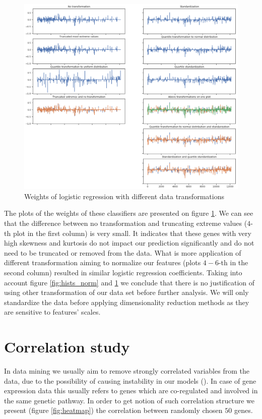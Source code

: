 \documentclass[shortabstract, english, mgr]{iithesis}
\begin{document}
\begin{figure}
\centering
\includegraphics[width=1.1\textwidth]{images/normalization_coeffs.png}
\caption{Weights of logistic regression with different data transformations}
\label{fig:normalization}
\end{figure}

The plots of the weights of these classifiers are presented on figure \ref{fig:normalization}. We can see that the difference between no transformation and truncating extreme values ($4$-th plot in the first column) is very small. It indicates that these genes with very high skewness and kurtosis do not impact our prediction significantly and do not need to be truncated or removed from the data. What is more application of different transformation aiming to normalize our features (plots $4-6$-th in the second column) resulted in similar logistic regression coefficients. Taking into account figure \ref{fig:hists_norm} and \ref{fig:normalization} we conclude that there is no justification of using other transformation of our data set before further analysis. We will only standardize the data before applying dimensionality reduction methods as they are sensitive to features' scales.

\section{Correlation study}

In data mining we usually aim to remove strongly correlated variables from the data, due to the possibility of causing instability in our models (\cite{Correlation}). In case of gene expression data this usually refers to genes which are co-regulated and involved in the same genetic pathway. In order to get notion of such correlation structure we present (figure \ref{fig:heatmap}) the correlation between randomly chosen $50$ genes. 
\end{document}
